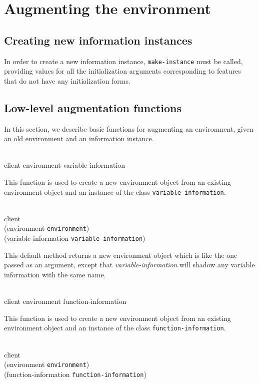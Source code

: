 \chapter{Augmenting the environment}

\section{Creating new information instances}

In order to create a new information instance, \texttt{make-instance}
must be called, providing values for all the initialization arguments
corresponding to features that do not have any initialization forms.

\section{Low-level augmentation functions}

In this section, we describe basic functions for augmenting an
environment, given an old environment and an information instance.

\\
            {client environment variable-information}

This function is used to create a new environment object from an
existing environment object and an instance of the class
\texttt{variable-information}.

\\
           {client\\
            (environment {\tt environment})\\
            (variable-information {\tt variable-information})}

This default method returns a new environment object which is like the
one passed as an argument, except that \textit{variable-information}
will shadow any variable information with the same name.

\\
            {client environment function-information}

This function is used to create a new environment object from an
existing environment object and an instance of the class
\texttt{function-information}.

\\
           {client\\
            (environment {\tt environment})\\
            (function-information {\tt function-information})}

